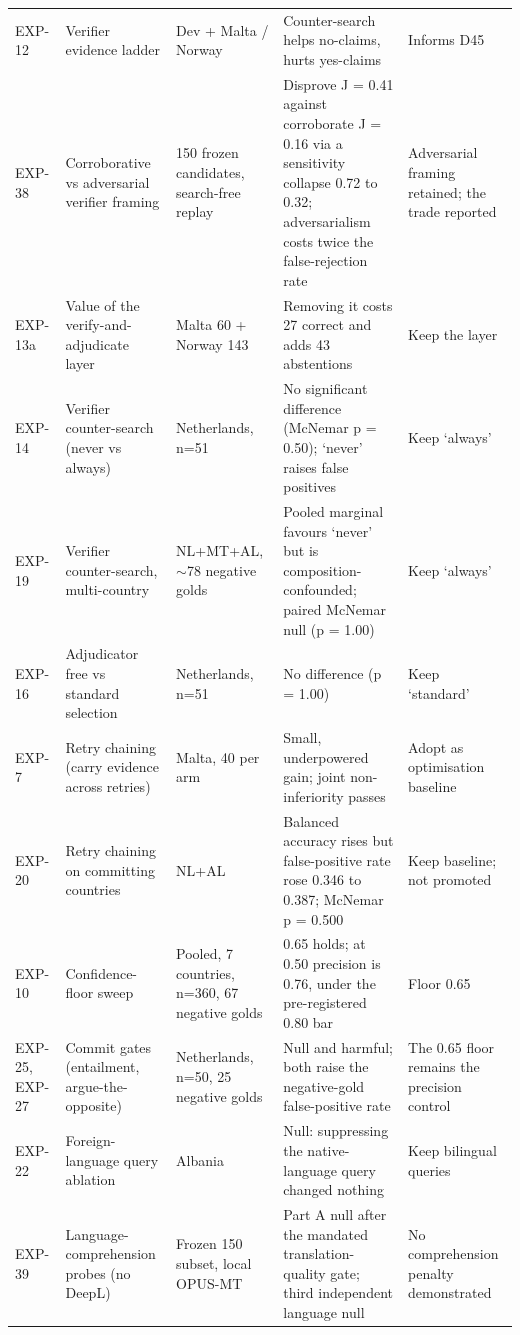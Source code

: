 {\begin{longtable}[]{@{}
  L{0.1106}
  L{0.2295}
  L{0.2428}
  L{0.2362}
  L{0.1808}@{}}
EXP-12 & Verifier evidence ladder & Dev + Malta / Norway & Counter-search helps no-claims, hurts yes-claims & Informs D45 \\
EXP-38 & Corroborative vs adversarial verifier framing & 150 frozen candidates, search-free replay & Disprove J = 0.41 against corroborate J = 0.16 via a sensitivity collapse 0.72 to 0.32; adversarialism costs twice the false-rejection rate & Adversarial framing retained; the trade reported \\
\mbox{EXP-13a} & Value of the verify-and-adjudicate layer & Malta 60 + Norway 143 & Removing it costs 27 correct and adds 43 abstentions & Keep the layer \\
EXP-14 & Verifier counter-search (never vs always) & Netherlands, n=51 & No significant difference (McNemar p = 0.50); `never' raises false positives & Keep `always' \\
EXP-19 & Verifier counter-search, multi-country & NL+MT+AL, $\sim$78 negative golds & Pooled marginal favours `never' but is composition-confounded; paired McNemar null (p = 1.00) & Keep `always' \\
EXP-16 & Adjudicator free vs standard selection & Netherlands, n=51 & No difference (p = 1.00) & Keep `standard' \\
EXP-7 & Retry chaining (carry evidence across retries) & Malta, 40 per arm & Small, underpowered gain; joint non-inferiority passes & Adopt as optimisation baseline \\
EXP-20 & Retry chaining on committing countries & NL+AL & Balanced accuracy rises but false-positive rate rose 0.346 to 0.387; McNemar p = 0.500 & Keep baseline; not promoted \\
EXP-10 & Confidence-floor sweep & Pooled, 7 countries, n=360, 67 negative golds & 0.65 holds; at 0.50 precision is 0.76, under the pre-registered 0.80 bar & Floor 0.65 \\
EXP-25, EXP-27 & Commit gates (entailment, argue-the-opposite) & Netherlands, n=50, 25 negative golds & Null and harmful; both raise the negative-gold false-positive rate & The 0.65 floor remains the precision control \\
EXP-22 & Foreign-language query ablation & Albania & Null: suppressing the native-language query changed nothing & Keep bilingual queries \\
EXP-39 & Language-comprehension probes (no DeepL) & Frozen 150 subset, local OPUS-MT & Part A null after the mandated translation-quality gate; third independent language null & No comprehension penalty demonstrated \\

\end{longtable}}
